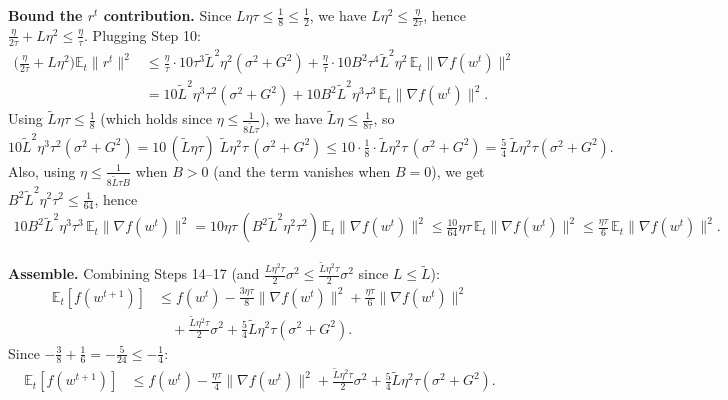 \documentclass{article}
\begin{document}
\textbf{Bound the $r^t$ contribution.} Since $L\eta\tau \le \tfrac18 \le \tfrac12$, we have $L\eta^2 \le \frac{\eta}{2\tau}$, hence $\frac{\eta}{2\tau}+L\eta^2 \le \frac{\eta}{\tau}$. Plugging Step 10:
\begin{align}
\Big(\frac{\eta}{2\tau}+L\eta^2\Big)\mathbb{E}_t\|r^t\|^2
&\le \frac{\eta}{\tau}\cdot 10\tau^3\tilde L^2\eta^2(\sigma^2+G^2)
 + \frac{\eta}{\tau}\cdot 10 B^2\tau^4\tilde L^2\eta^2\,\mathbb{E}_t\|\nabla f(w^t)\|^2 \nonumber\\
&= 10\tilde L^2\eta^3\tau^2(\sigma^2+G^2)
 + 10 B^2\tilde L^2\eta^3\tau^3\,\mathbb{E}_t\|\nabla f(w^t)\|^2 .
\tag{Step 16}
\end{align}
Using $\tilde L\eta\tau \le \tfrac18$ (which holds since $\eta\le \tfrac{1}{8\tilde L\tau}$), we have $\tilde L\eta \le \tfrac{1}{8\tau}$, so
\[
10\tilde L^2\eta^3\tau^2(\sigma^2+G^2)
= 10\,(\tilde L\eta\tau)\;\tilde L\eta^2\tau\,(\sigma^2+G^2)
\le 10\cdot\tfrac18\cdot \tilde L\eta^2\tau\,(\sigma^2+G^2)
= \tfrac{5}{4}\,\tilde L\eta^2\tau(\sigma^2+G^2).
\]
Also, using $\eta \le \frac{1}{8\tilde L\tau B}$ when $B>0$ (and the term vanishes when $B=0$), we get $B^2\tilde L^2\eta^2\tau^2 \le \tfrac{1}{64}$, hence
\begin{align}
10B^2\tilde L^2\eta^3\tau^3\,\mathbb{E}_t\|\nabla f(w^t)\|^2
= 10\eta\tau\,(B^2\tilde L^2\eta^2\tau^2)\,\mathbb{E}_t\|\nabla f(w^t)\|^2
\le \tfrac{10}{64}\eta\tau\,\mathbb{E}_t\|\nabla f(w^t)\|^2
\le \frac{\eta\tau}{6}\,\mathbb{E}_t\|\nabla f(w^t)\|^2 .
\tag{Step 17}
\end{align}

\textbf{Assemble.} Combining Steps 14--17 (and $\frac{L\eta^2\tau}{2}\sigma^2 \le \frac{\tilde L\eta^2\tau}{2}\sigma^2$ since $L\le\tilde L$):
\begin{align}
\mathbb{E}_t[f(w^{t+1})]
&\le f(w^t) - \frac{3\eta\tau}{8}\|\nabla f(w^t)\|^2 + \frac{\eta\tau}{6}\|\nabla f(w^t)\|^2 \nonumber\\
&\quad + \frac{\tilde L\eta^2\tau}{2}\sigma^2 + \frac{5}{4}\tilde L\eta^2\tau(\sigma^2+G^2) .
\tag{Step 18}
\end{align}
Since $-\tfrac38 + \tfrac16 = -\tfrac{5}{24} \le -\tfrac14$:
\begin{align}
\mathbb{E}_t[f(w^{t+1})]
&\le f(w^t) - \frac{\eta\tau}{4}\|\nabla f(w^t)\|^2
 + \frac{\tilde L\eta^2\tau}{2}\sigma^2
 + \frac{5}{4}\tilde L\eta^2\tau(\sigma^2+G^2).
\tag{Step 19}
\end{align}
\end{document}
